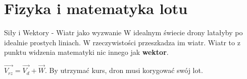 \section{Fizyka i matematyka lotu}

\begin{frame}{Siły i Wektory - Wiatr jako wyzwanie}
    W idealnym świecie drony latałyby po idealnie prostych liniach. W rzeczywistości przeszkadza im wiatr. Wiatr to z punktu widzenia matematyki nic innego jak \textbf{wektor}.
    
    \vspace{0.5cm}
    \begin{center}
    \end{center}
    \vspace{0.2cm}
    $\vec{V_{rz}} = \vec{V_d} + \vec{W}$. By utrzymać kurs, dron musi korygować swój lot.
\end{frame}

